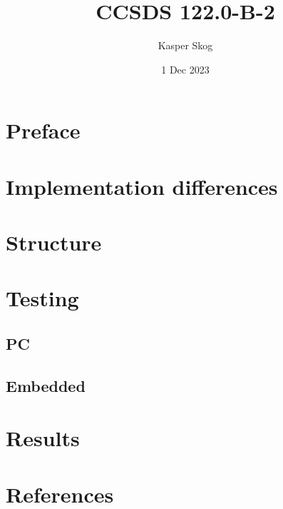 \documentclass[12pt, a4paper]{article}
\title{CCSDS 122.0-B-2}
\author{Kasper Skog}
\date{1 Dec 2023}
\begin{document}
\maketitle
\tableofcontents

\newpage

\section{Preface}
\section{Implementation differences}
\section{Structure}
\section{Testing}
\subsection{PC}
\subsection{Embedded}
\section{Results}

\section{References}
\listoffigures


\end{document}
